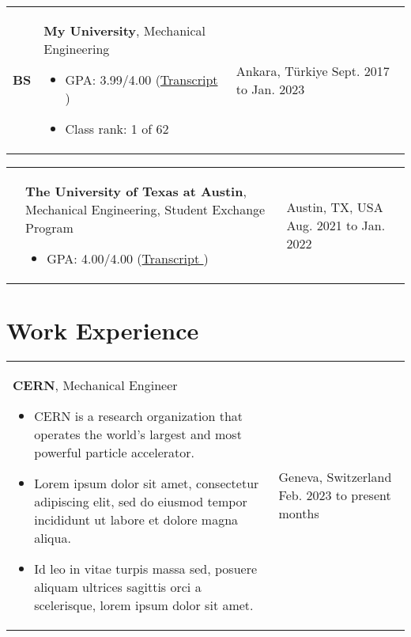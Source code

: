 \documentclass[10pt, a4paper]{article}
\newenvironment{highlights}{
        \begin{itemize}[
                topsep=0pt,
                parsep=0.10 cm,
                partopsep=0pt,
                itemsep=0pt,
                after=\vspace{-1\baselineskip},
                leftmargin=0.4 cm + 3pt
            ]
    }{
        \end{itemize}
    } %
\let\hrefWithoutArrow\href
\renewcommand{\href}[2]{\hrefWithoutArrow{#1}{#2 \raisebox{.15ex}{\footnotesize \faExternalLink*}}}
\begin{document}
        \begin{tabularx}{ cm-0.13cm}{L{0.85cm} K{0.2 cm} R{3.6 cm}}
            \textbf{BS}
            & 
            \textbf{My University}, Mechanical Engineering
            \vspace{0.10 cm}
            \begin{highlights}
                \item GPA: 3.99/4.00 (\href{https://example.com/}{Transcript}) 
                \item Class rank: 1 of 62 \hspace*{-0.2cm}
            \end{highlights}
        &
            Ankara, Türkiye \newline
            Sept. 2017 to Jan. 2023
        \end{tabularx}

        \vspace{0.2 cm}
        \begin{tabularx}{ cm-0.13cm}{L{0.85cm} K{0.2 cm} R{3.6 cm}}
            \textbf{}
            & 
            \textbf{The University of Texas at Austin}, Mechanical Engineering, Student Exchange Program
            \vspace{0.10 cm}
            \begin{highlights}
                \item GPA: 4.00/4.00 (\href{https://example.com/}{Transcript}) \hspace*{-0.2cm}
            \end{highlights}
        &
            Austin, TX, USA \newline
            Aug. 2021 to Jan. 2022
        \end{tabularx}



    \section{Work Experience}
    
        \begin{tabularx}{ cm-0.13cm}{K{0.2 cm} R{3.6 cm}}
            \textbf{CERN}, Mechanical Engineer
            \vspace{0.10 cm}
            \begin{highlights}
                \item CERN is a research organization that operates the world's largest and most powerful particle accelerator. 
                \item Lorem ipsum dolor sit amet, consectetur adipiscing elit, sed do eiusmod tempor incididunt ut labore et dolore magna aliqua. 
                \item Id leo in vitae turpis massa sed, posuere aliquam ultrices sagittis orci a scelerisque, lorem ipsum dolor sit amet. \hspace*{-0.2cm}
            \end{highlights}
        &
            Geneva, Switzerland \newline
            Feb. 2023 to present  months
        \end{tabularx}
\end{document}

